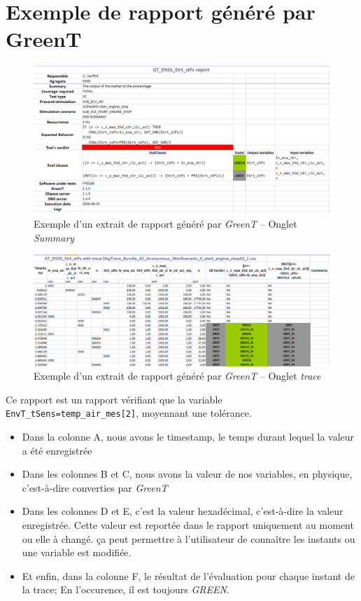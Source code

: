 \chapter{Exemple de rapport généré par GreenT}\label{apendixReport}
\begin{figure}[H]
\centering
\includegraphics[width=16cm]{contents/images/report0.png}

\caption{Exemple d'un extrait de rapport généré par \textit{GreenT} -- Onglet \textit{Summary}}
\end{figure}
\begin{figure}[H]
\centering
\includegraphics[width=16cm]{contents/images/report.png}
\caption{Exemple d'un extrait de rapport généré par \textit{GreenT} -- Onglet \textit{trace}}
\end{figure}
Ce rapport est un rapport vérifiant que la variable \texttt{EnvT\_tSens=temp\_air\_mes[2]}, moyennant une tolérance. 

\begin{itemize}
\item Dans la colonne A, nous avons le timestamp, le temps durant lequel la valeur a été enregistrée
\item Dans les colonnes B et C, nous avons la valeur de nos variables, en physique, c'est-à-dire converties par \textit{GreenT}
\item Dans les colonnes D et E, c'est la valeur hexadécimal, c'est-à-dire la valeur enregistrée. Cette valeur est reportée dans le rapport uniquement au moment ou elle à changé. ça peut permettre à l'utilisateur de connaître les instants ou une variable est modifiée.
\item Et enfin, dans la colonne F, le résultat de l'évaluation pour chaque instant de la trace; En l'occurence, il est toujours \textit{GREEN}.
\end{itemize}